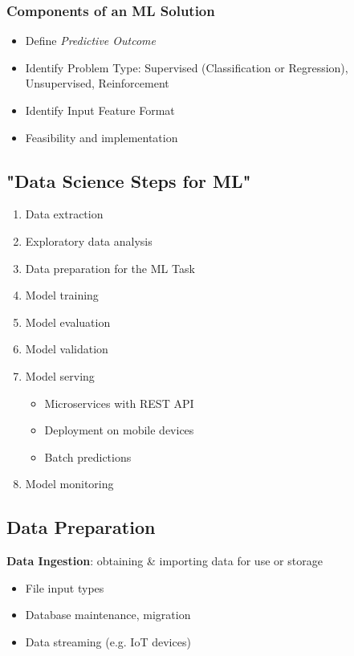 \documentclass[10pt,landscape,letterpaper]{cheatsheet}
\begin{document}
\begin{multicols}{3}
\subsubsection{Components of an ML Solution}

\begin{itemize}
    \item Define \emph{Predictive Outcome}
    \item Identify Problem Type: Supervised (Classification or Regression), Unsupervised, Reinforcement
    \item Identify Input Feature Format
    \item Feasibility and implementation
\end{itemize}

\subsection{"Data Science Steps for ML"}

\begin{enumerate}
    \item Data extraction
    \item Exploratory data analysis
    \item Data preparation for the ML Task
    \item Model training
    \item Model evaluation
    \item Model validation
    \item Model serving
    \begin{itemize}
        \item Microservices with REST API
        \item Deployment on mobile devices
        \item Batch predictions
    \end{itemize}
    \item Model monitoring
\end{enumerate}

\subsection{Data Preparation}

\textbf{Data Ingestion}: obtaining \& importing data for use or storage

\begin{itemize}
    \item File input types
    \item Database maintenance, migration
    \item Data streaming (e.g. IoT devices)
\end{itemize}


\end{multicols}
\end{document}

